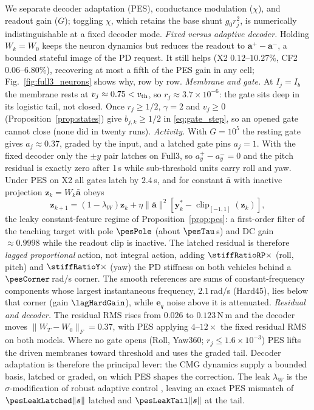 \documentclass[letterpaper, 10 pt, conference]{ieeeconf}
\newcommand{\clip}{\operatorname{clip}}
\begin{document}
We separate decoder adaptation (PES), conductance modulation ($\chi$), and
readout gain ($G$); toggling $\chi$, which retains the base shunt
$g_0r_j^2$, is numerically indistinguishable at a fixed decoder mode.
\emph{Fixed versus adaptive decoder.} Holding $W_k=W_0$ keeps the neuron
dynamics but reduces the readout to $\bm a^+-\bm a^-$, a bounded stateful
image of the PD request. It still helps (X2 $0.12$--$10.27\%$, CF2
$0.06$--$6.80\%$), recovering at most a fifth of the PES gain in any cell;
Fig.~\ref{fig:full3_neurons} shows why, row by row.
\emph{Membrane and gate.} At $I_j=I_b$ the membrane rests at
$v_j\approx0.75<v_{\rm th}$, so $r_j\approx3.7\times10^{-6}$: the gate sits
deep in its logistic tail, not closed. Once $r_j\ge1/2$, $\gamma=2$ and
$v_j\ge0$ (Proposition~\ref{prop:states}) give $b_{j,k}\ge1/2$ in
\eqref{eq:gate_step}, so an opened gate cannot close (none did in twenty
runs). \emph{Activity.} With $G=10^5$ the resting gate gives
$a_j\approx0.37$, graded by the input, and a latched gate pins $a_j=1$. With
the fixed decoder only the $\pm y$ pair latches on Full3, so
$a^+_y-a^-_y=0$ and the pitch residual is exactly zero after 1\,s while
sub-threshold units carry roll and yaw. Under PES on X2 all gates latch by
$2.4$\,s, and for constant $\bar{\bm a}$ with inactive projection
$\bm z_k=W_k\bar{\bm a}$ obeys
\begin{equation}
 \bm z_{k+1}=(1-\lambda_W)\bm z_k
 +\eta\|\bar{\bm a}\|^2[\bm y_k^*-\clip_{[-1,1]}(\bm z_k)],
 \label{eq:constantbasis}
\end{equation}
the leaky constant-feature regime of Proposition~\ref{prop:pes}: a
first-order filter of the teaching target with pole $\pesPole$ (about
$\pesTau$\,s) and DC gain $\approx0.9998$ while the readout clip is
inactive. The latched residual is therefore \emph{lagged proportional}
action, not integral action, adding $\stiffRatioRP\times$ (roll, pitch) and
$\stiffRatioY\times$ (yaw) the PD stiffness on both vehicles behind a
$\pesCorner$\,rad/s corner. The smooth references are sums of
constant-frequency components \cite{sandoval2018instantaneous} whose largest
instantaneous frequency, $2.1$\,rad/s (Hard45), lies below that corner (gain
$\lagHardGain$), while $\bm e_q$ noise above it is attenuated.
\emph{Residual and decoder.} The residual RMS rises from $0.026$ to
$0.123$\,N\,m and the decoder moves $\|W_T-W_0\|_F=0.37$, with PES applying
$4$--$12\times$ the fixed residual RMS on both models. Where no gate opens
(Roll, Yaw360; $r_j\le1.6\times10^{-3}$) PES lifts the driven membranes
toward threshold and uses the graded tail. Decoder adaptation is therefore
the principal lever: the CMG dynamics supply a bounded basis, latched or
graded, on which PES shapes the correction. The leak $\lambda_W$ is the
$\sigma$-modification of robust adaptive control
\cite{ioannou1996robust}, leaving an exact PES mismatch of
$\pesLeakLatched\|\bm s\|$ latched and $\pesLeakTail\|\bm s\|$ at the tail.
\end{document}
